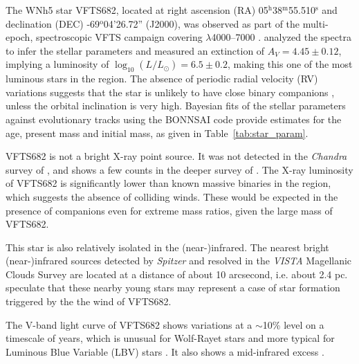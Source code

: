 \documentclass[a4paper,fleqn,usenatbib]{mnras}
\DeclareRobustCommand{\Tabref}[1]{Table~\ref{#1}}
\begin{document}
The WNh5 star VFTS682, located at right ascension (RA)
05$^\mathrm{h}$38$^\mathrm{m}$55.510$^\mathrm{s}$  and declination
(DEC) \mbox{-69$^\mathrm{o}$04'26.72''} (J2000), was observed as part of the multi-epoch, spectroscopic VFTS campaign covering $\lambda$4000--7000 \citep[][]{evans:11}. 
\citet{bestenlehner:11}  analyzed the spectra to infer the stellar
parameters and measured an extinction of $A_V=4.45\pm0.12$, implying a
luminosity of $\log_{10}(L/L_\odot) =  6.5\pm0.2$, making this one of
the most luminous stars in the region. The absence of periodic radial
velocity (RV)
variations suggests that the star is unlikely to have close binary
companions \citep[][]{bestenlehner:11}, unless the orbital inclination is
very high. Bayesian fits of the stellar
parameters against evolutionary tracks \citep{brott:11, kohler:15}
using the BONNSAI code \citep{schneider:14,schneider:17} provide
estimates for the age, present mass and initial mass, %
as given in \Tabref{tab:star_param}. %

VFTS682 is not a bright X-ray point source. It was not detected in the
\emph{Chandra} survey of \cite{townsley:06}, and shows a few counts in
the deeper survey of \cite{townsley:14}.
The X-ray luminosity of VFTS682
is significantly lower than known massive binaries in the region, which suggests the absence of
colliding winds. These would be expected in the presence of companions
even for extreme mass ratios, given the large mass of
VFTS682.

This star is also relatively isolated in the \mbox{(near-)infrared}. The nearest bright (near-)infrared sources detected by
\emph{Spitzer} \citep{meixner:06} and resolved in the \emph{VISTA}
Magellanic Clouds Survey \citep{cioni:11} are located at a distance of
about 10 arcsecond, i.e. about 2.4 pc. \cite{walborn:13} speculate
that these nearby young stars may represent a case of star formation triggered by the the wind of VFTS682.

The V-band light curve of VFTS682  shows
variations at a $\sim$10\% level on a timescale of years, which is
unusual for Wolf-Rayet stars and more typical for Luminous Blue
Variable (LBV) stars \citep{udalski:08, bestenlehner:11}. It also
shows a mid-infrared excess \citep{gruendl:09}.
\end{document}

